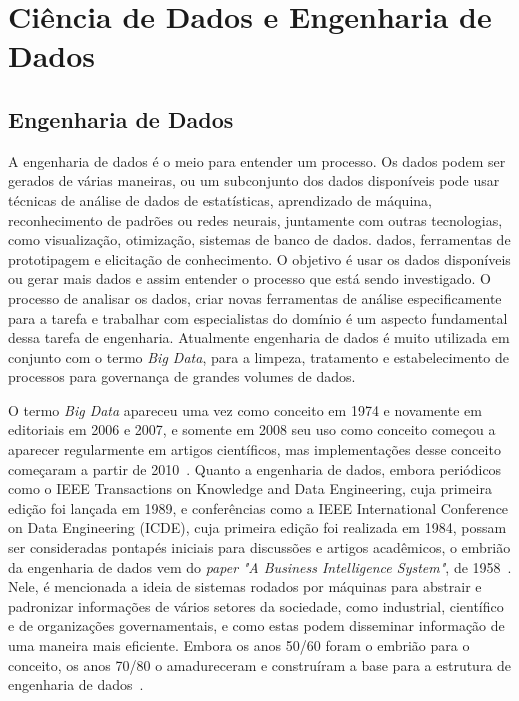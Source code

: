 \documentclass[portugues]{ic-tese}
\begin{document}
\section{Ciência de Dados e Engenharia de Dados}
\label{sec:CienciaEngDados}

\subsection{Engenharia de Dados}

A engenharia de dados é o meio para entender um processo. Os dados podem ser gerados de várias maneiras, ou um subconjunto dos dados disponíveis pode usar técnicas de análise de dados de estatísticas, aprendizado de máquina, reconhecimento de padrões ou redes neurais, juntamente com outras tecnologias, como visualização, otimização, sistemas de banco de dados. dados, ferramentas de prototipagem e elicitação de conhecimento. O objetivo é usar os dados disponíveis ou gerar mais dados e assim entender o processo que está sendo investigado. O processo de analisar os dados, criar novas ferramentas de análise especificamente para a tarefa e trabalhar com especialistas do domínio é um aspecto fundamental dessa tarefa de engenharia. Atualmente engenharia de dados é muito utilizada em conjunto com o termo \textit{Big Data}, para a limpeza, tratamento e estabelecimento de processos para governança de grandes volumes de dados.

O termo \textit{Big Data} apareceu uma vez como conceito em 1974 e novamente em editoriais em 2006 e 2007, e somente em 2008 seu uso como conceito começou a aparecer regularmente em artigos científicos, mas implementações desse conceito começaram a partir de 2010~\citep{Raban_2020}. Quanto a engenharia de dados, embora periódicos como o IEEE Transactions on Knowledge and Data Engineering, cuja primeira edição foi lançada em 1989, e conferências como a IEEE International Conference on Data Engineering (ICDE), cuja primeira edição foi realizada em 1984, possam ser consideradas pontapés iniciais para discussões e artigos acadêmicos, o embrião da engenharia de dados vem do \textit{paper} \textit{"A Business Intelligence System"}, de 1958~\citep{Panoply_2017}. Nele, é mencionada a ideia de sistemas rodados por máquinas para abstrair e padronizar informações de vários setores da sociedade, como industrial, científico e de organizações governamentais, e como estas podem disseminar informação de uma maneira mais eficiente. Embora os anos 50/60 foram o embrião para o conceito, os anos 70/80 o amadureceram e construíram a base para a estrutura de engenharia de dados~\citep{Panoply_2017}.
\end{document}

